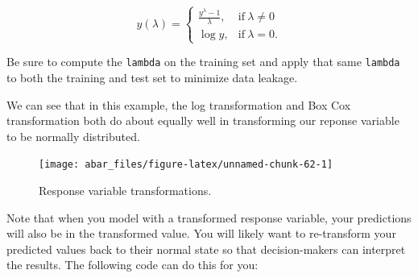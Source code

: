\documentclass[]{book}
\newenvironment{Shaded}{\begin{snugshade}}{\end{snugshade}}
\newcommand{\CommentTok}[1]{\textcolor[rgb]{0.56,0.35,0.01}{\textit{#1}}}
\newcommand{\DecValTok}[1]{\textcolor[rgb]{0.00,0.00,0.81}{#1}}
\newcommand{\KeywordTok}[1]{\textcolor[rgb]{0.13,0.29,0.53}{\textbf{#1}}}
\newcommand{\NormalTok}[1]{#1}
\newcommand{\OperatorTok}[1]{\textcolor[rgb]{0.81,0.36,0.00}{\textbf{#1}}}
\newcommand{\StringTok}[1]{\textcolor[rgb]{0.31,0.60,0.02}{#1}}
\theoremstyle{definition}
\theoremstyle{definition}
\theoremstyle{definition}
\theoremstyle{remark}
\begin{document}
\[
 \begin{equation} 
 y(\lambda) =
\begin{cases}
   \frac{y^\lambda-1}{\lambda}, & \text{if}\ \lambda \neq 0 \\
   \log y, & \text{if}\ \lambda = 0.
\end{cases}
\end{equation}
\]

\begin{rmdwarning}
Be sure to compute the \texttt{lambda} on the training set and apply
that same \texttt{lambda} to both the training and test set to minimize
data leakage.
\end{rmdwarning}

\begin{Shaded}
\end{Shaded}

We can see that in this example, the log transformation and Box Cox
transformation both do about equally well in transforming our reponse
variable to be normally distributed.

\begin{figure}

{\centering \texttt{[image: abar\_files/figure-latex/unnamed-chunk-62-1]} 

}

\caption{Response variable transformations.}\label{fig:unnamed-chunk-62}
\end{figure}

Note that when you model with a transformed response variable, your
predictions will also be in the transformed value. You will likely want
to re-transform your predicted values back to their normal state so that
decision-makers can interpret the results. The following code can do
this for you:
\end{document}
